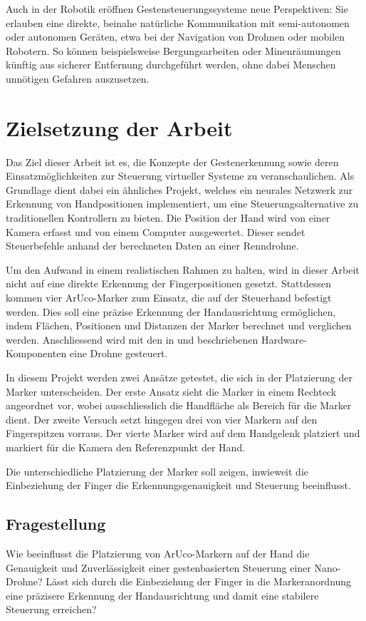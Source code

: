 Auch in der Robotik eröffnen Gestensteuerungssysteme neue Perspektiven: Sie erlauben eine direkte, beinahe natürliche Kommunikation mit semi-autonomen oder autonomen Geräten, etwa bei der Navigation von Drohnen oder mobilen Robotern.
So können beispielsweise Bergungsarbeiten oder Minenräumungen künftig aus sicherer Entfernung durchgeführt werden, ohne dabei Menschen unnötigen Gefahren auszusetzen.

\section{Zielsetzung der Arbeit}
Das Ziel dieser Arbeit ist es, die Konzepte der Gestenerkennung sowie deren Einsatzmöglichkeiten zur Steuerung virtueller Systeme zu veranschaulichen.
Als Grundlage dient dabei ein ähnliches Projekt, welches ein neurales Netzwerk zur Erkennung von Handpositionen implementiert, um eine Steuerungsalternative zu traditionellen Kontrollern zu bieten.
Die Position der Hand wird von einer Kamera erfasst und von einem Computer ausgewertet.
Dieser sendet Steuerbefehle anhand der berechneten Daten an einer Renndrohne.\cite{arxiv:OmniRace}

Um den Aufwand in einem realistischen Rahmen zu halten, wird in dieser Arbeit nicht auf eine direkte Erkennung der Fingerpositionen gesetzt.
Stattdessen kommen vier ArUco-Marker zum Einsatz, die auf der Steuerhand befestigt werden.
Dies soll eine präzise Erkennung der Handausrichtung ermöglichen, indem Flächen, Positionen und Distanzen der Marker berechnet und verglichen werden.
Anschliessend wird mit den in  und  beschriebenen Hardware-Komponenten eine Drohne gesteuert.

In diesem Projekt werden zwei Ansätze getestet, die sich in der Platzierung der Marker unterscheiden.
Der erste Ansatz sieht die Marker in einem Rechteck angeordnet vor, wobei ausschliesslich die Handfläche als Bereich für die Marker dient.
Der zweite Versuch setzt hingegen drei von vier Markern auf den Fingerspitzen vorraus.
Der vierte Marker wird auf dem Handgelenk platziert und markiert für die Kamera den Referenzpunkt der Hand.

Die unterschiedliche Platzierung der Marker soll zeigen, inwieweit die Einbeziehung der Finger die Erkennungsgenauigkeit und Steuerung beeinflusst.

\subsection{Fragestellung}
Wie beeinflusst die Platzierung von ArUco-Markern auf der Hand die Genauigkeit und Zuverlässigkeit einer gestenbasierten Steuerung einer Nano-Drohne?  
Lässt sich durch die Einbeziehung der Finger in die Markeranordnung eine präzisere Erkennung der Handausrichtung und damit eine stabilere Steuerung erreichen?

